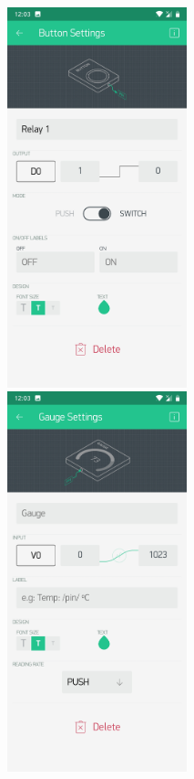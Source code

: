 \documentclass[12pt,a4paper]{article}
\begin{document}
\begin{figure}[h!]
\centerline{%
\includegraphics[width=9cm,height=11cm]{Lab7_1.jpg}%
\hspace{0.5 cm}
\includegraphics[width=9cm,height=11cm]{Lab7_2.jpg}%
}
\end{figure}
\end{document}
